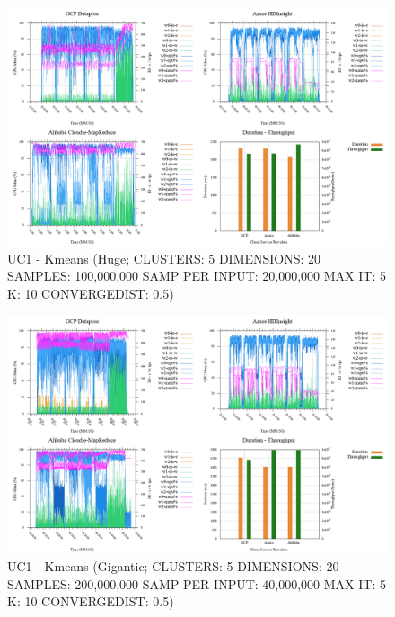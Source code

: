 \documentclass[review]{elsarticle}
\begin{document}
\begin{figure}[b]
	\caption{UC1 - Kmeans (Huge; CLUSTERS: 5 DIMENSIONS: 20 SAMPLES: 100,000,000 SAMP PER INPUT: 20,000,000 MAX IT: 5 K: 10 CONVERGEDIST: 0.5)}
	\label{fig:uc1-kmeans-h-cmidt}
	\includegraphics[width=\textwidth]{uc1-kmeans-h-cmidt}
	\centering
\end{figure}

\begin{figure}[b]
	\caption{UC1 - Kmeans (Gigantic; CLUSTERS: 5 DIMENSIONS: 20 SAMPLES: 200,000,000 SAMP PER INPUT: 40,000,000 MAX IT: 5 K: 10 CONVERGEDIST: 0.5)}
	\label{fig:uc1-kmeans-g-cmidt}
	\includegraphics[width=\textwidth]{uc1-kmeans-g-cmidt}
	\centering
\end{figure}
\end{document}
